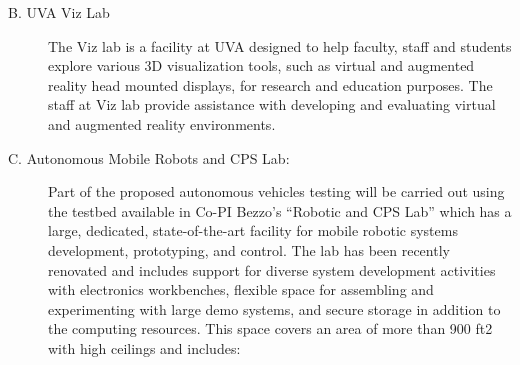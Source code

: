 \begin{description}
\item[B. UVA Viz Lab]
The Viz lab is a facility at UVA designed to help faculty, staff and students explore various 3D visualization tools, such as virtual and augmented reality head mounted displays, for research and education purposes. The staff at Viz lab provide assistance with developing and evaluating virtual and augmented reality environments. 

\item[C. Autonomous Mobile Robots and CPS Lab: ]
Part of the proposed autonomous vehicles testing will be carried out using the testbed available in Co-PI Bezzo’s “Robotic and CPS Lab” which has a large, dedicated, state-of-the-art facility for mobile robotic systems development, prototyping, and control. The lab has been recently renovated and includes support for diverse system development activities with electronics workbenches, ﬂexible space for assembling and experimenting with large demo systems, and secure storage in addition to the computing resources. This space covers an area of more than 900 ft2 with high ceilings and includes: 


\end{description}
